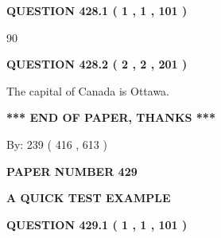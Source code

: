 \documentclass[12pt]{article}
\begin{document}
{\textbf{\Large{QUESTION
428.1 
 ( 1 , 1 , 101 )
}}}
  
  
 
 
\noindent{}

90
 
 
  
\vspace{0.2in}
  
{\textbf{\Large{QUESTION
428.2 
 ( 2 , 2 , 201 )
}}}
  
  
 
 
\noindent{}
 
 
The capital of Canada is Ottawa.
 
 
 
 
   
   
 \vspace{0.2in}
 
   
   
   
   
\vspace{1.0in} 
{\textbf{\large{ *** END OF PAPER, THANKS *** }}} 
   
   
\hspace{1.0in} By: 
 239 ( 416 ,  613 )
   
   
   
   
\newpage 
\setcounter{page}{ 
   429001 } 
   
   
   
   
 {\textbf{ \Large{ PAPER NUMBER  429  }}}
   
   
\vspace{0.2in}
   
   
   
   
   
   
 \vspace{0.2in}
{\LARGE {\textbf{ A QUICK TEST EXAMPLE}}}
   
   
  
\vspace{0.2in}
  
{\textbf{\Large{QUESTION
429.1 
 ( 1 , 1 , 101 )
}}}
  
  
 
 
\noindent{}
\end{document}
